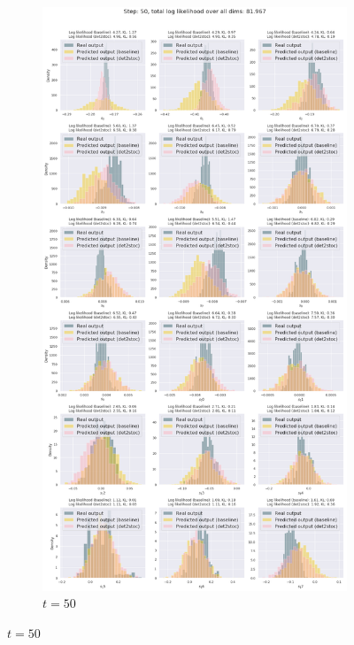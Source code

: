 \begin{figure}
\begin{subfigure}{\textwidth}
\end{subfigure}
\begin{subfigure}{\textwidth}
    \centering
    \includegraphics[trim=0 1650 0 50,clip,width=1.0\textwidth]
    {img/windyslope/output/output_distribution_step50_delta_all}
    \caption{$t=50$}
    \label{fig:output_distribution_step50_posvel_dettostoc}

\end{subfigure}
\end{figure}
